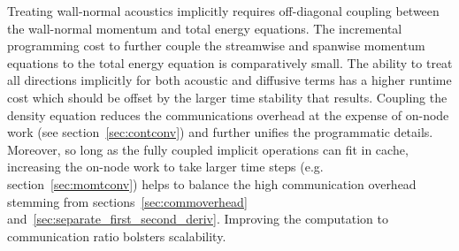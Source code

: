 \documentclass[letterpaper,11pt,nointlimits,reqno,draft]{amsbook}
\begin{document}
Treating wall-normal acoustics implicitly requires off-diagonal coupling
between the wall-normal momentum and total energy equations.  The incremental
programming cost to further couple the streamwise and spanwise momentum
equations to the total energy equation is comparatively small.  The ability to
treat all directions implicitly for both acoustic and diffusive terms has a
higher runtime cost which should be offset by the larger time stability that
results.  Coupling the density equation reduces the communications overhead at
the expense of on-node work (see section~\ref{sec:contconv}) and further
unifies the programmatic details.  Moreover, so long as the fully coupled
implicit operations can fit in cache, increasing the on-node work to take
larger time steps (e.g. section~\ref{sec:momtconv}) helps to balance the high
communication overhead stemming from sections~\ref{sec:commoverhead}
and~\ref{sec:separate_first_second_deriv}.  Improving the computation to
communication ratio bolsters scalability.
\end{document}

